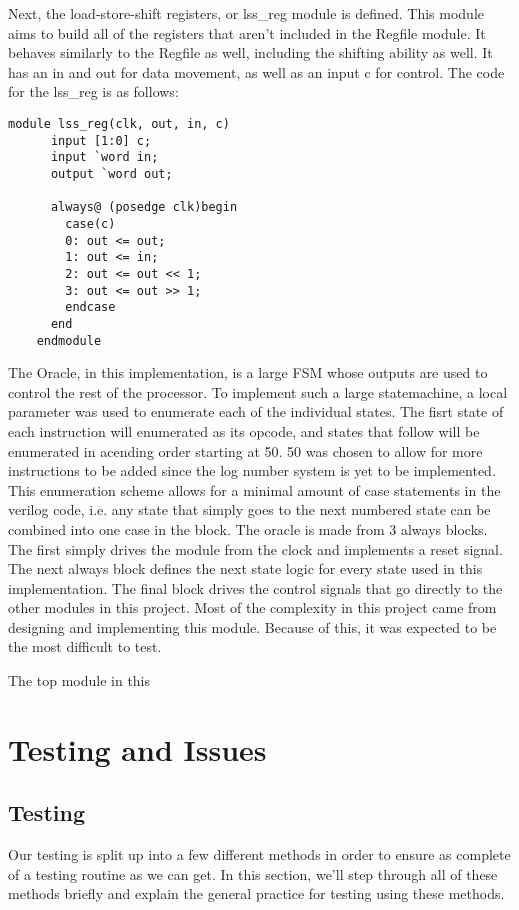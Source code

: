 \documentclass[journal]{IEEEtran}
\begin{document}
	Next, the load\--store\--shift registers, or lss\_reg module is defined. This module aims to build all of the registers that aren't included in the Regfile module. It behaves similarly to the Regfile as well, including the shifting ability as well. It has an in and out for data movement, as well as an input c for control. The code for the lss\_reg is as follows:
	
	\begin{Verbatim}[fontsize=\small]
	module lss_reg(clk, out, in, c)
	  input [1:0] c;
	  input `word in;
	  output `word out;
	
	  always@ (posedge clk)begin
	    case(c)
		0: out <= out;
		1: out <= in;
		2: out <= out << 1;
		3: out <= out >> 1;
		endcase
	  end
	endmodule
	\end{Verbatim}
	
	The Oracle, in this implementation, is a large FSM whose outputs are used to control the rest of the processor. To implement such a large statemachine, a local parameter was used to enumerate each of the individual states. The fisrt state of each instruction will enumerated as its opcode, and states that follow will be enumerated in acending order starting at 50. 50 was chosen to allow for more instructions to be added since the log number system is yet to be implemented. This enumeration scheme allows for a minimal amount of case statements in the verilog code, i.e. any state that simply goes to the next numbered state can be combined into one case in the block. 
	The oracle is made from 3 always blocks. The first simply drives the module from the clock and implements a reset signal. The next always block defines the next state logic for every state used in this implementation. The final block drives the control signals that go directly to the other modules in this project. Most of the complexity in this project came from designing and implementing this module. Because of this, it was expected to be the most difficult to test.
	
	The top module in this 
		
	
\section{Testing and Issues}
\subsection{Testing}
	Our testing is split up into a few different methods in order to ensure as complete of a testing routine as we can get. In this section, we'll step through all of these methods briefly and explain the general practice for testing using these methods. \\
	
\end{document}
